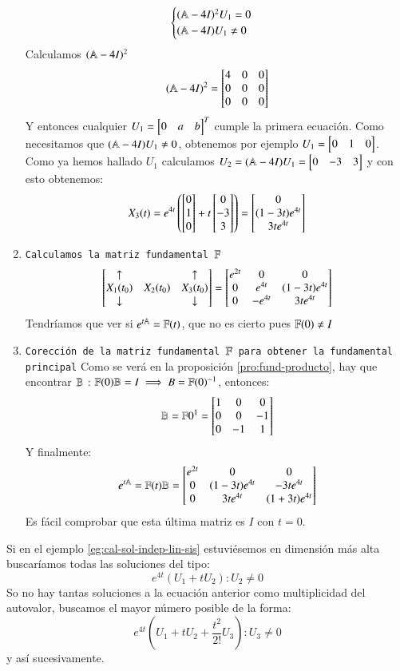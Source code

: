 \begin{eg}
\begin{enumerate}
        $$
            \begin{cases}
                (\mathbb{A} - 4I)^2 U_1 = 0\\
                (\mathbb{A} - 4I) U_1 \neq 0
            \end{cases}
        $$
        Calculamos $(\mathbb{A} - 4I)^2$
        $$
            (\A - 4I)^2 = \mx{4 & 0 & 0 \\ 0 & 0 & 0\\ 0 & 0 & 0}
        $$
        Y entonces cualquier $U_1 = \mx{0 & a & b}^T$ cumple la primera ecuación. Como necesitamos que  $(\mathbb{A} - 4I) U_1 \neq 0$, obtenemos por ejemplo $U_1 = \mx{0 & 1 & 0}$.\\
        Como ya hemos hallado $U_1$ calculamos $U_2 = (\A - 4I) U_1 = \mx{0 & -3 & 3}$ y con esto obtenemos:
        $$
            X_3(t) = e^{4 t} \left( \mx{0 \\ 1 \\ 0} + t \mx{0 \\ -3 \\ 3}\right) = \mx{0 \\ (1-3t) e^{4t} \\ 3t e^{4t}}
        $$
        \item \texttt{Calculamos la matriz fundamental $\mathbb{F}$}
            $$
                \mx{\uparrow && \uparrow\\ X_1(t_0) & X_2(t_0) & X_3(t_0) \\ \downarrow && \downarrow} =
                \mx{e^{2t} & 0 & 0 \\ 0 & e^{4t} & (1-3t) e^{4t} \\ 0 & -e^{4t} & 3te^{4t}}
            $$
            Tendríamos que ver si $e^{t\mathbb{A}} = \mathbb{F}(t)$, que no es cierto pues $\mathbb{F}(0) \neq I$
        \item \texttt{Corección de la matriz fundamental $\mathbb{F}$ para obtener la fundamental principal}
            Como se verá en la proposición \ref{pro:fund-producto}, hay que encontrar $\mathbb{B}$ : $\mathbb{F}(0)\mathbb{B} = I \implies B = \mathbb{F}(0)^{-1}$, entonces:
            $$
                \B = \F{0}^{1} = \mx{1 & 0 & 0\\0 & 0 & -1 \\ 0 & -1 & 1}
            $$
            Y finalmente:
            $$
                e^{t\A} = \F(t)\B = \mx{e^{2t} & 0 & 0\\ 0 & (1-3t)e^{4t} & -3te^{4t} \\ 0 & 3te^{4t} & (1+3t)e^{4t}}
            $$
            Es fácil comprobar que esta última matriz es $I$ con $t=0$.
    \end{enumerate}
\end{eg}
\begin{obs}
    Si en el ejemplo \ref{eg:cal-sol-indep-lin-sis} estuviésemos en dimensión más alta buscaríamos todas las soluciones del tipo:
    $$
        e^{4t}(U_1 + tU_2) : U_2 \neq 0
    $$
    So no hay tantas soluciones a la ecuación anterior como multiplicidad del autovalor, buscamos el mayor número posible de la forma:
    $$
        e^{4t}(U_1 + tU_2 + \frac{t^2}{2!}U_3) : U_3 \neq 0
    $$
    y así sucesivamente.
\end{obs}

